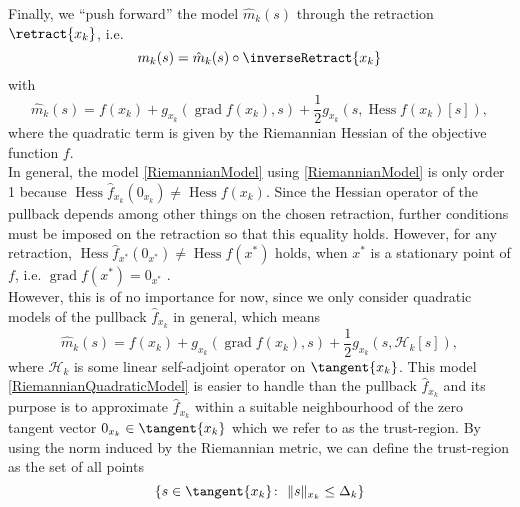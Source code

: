 Finally, we “push forward” the model $\hat{m}_k(s)$ through the retraction $\retract{x_k}$, i.e.
\begin{equation}\label{RiemannianModel}
    m_k(s) = \hat{m}_k(s) \circ \inverseRetract{x_k}
\end{equation}
with
\begin{equation}\label{RiemannianModelTangent}
    \hat{m}_k( s ) = f(x_k) + g_{x_k}(\operatorname{grad} f(x_k), s ) + \frac{1}{2} g_{x_k}( s, \operatorname{Hess} f(x_k) [s]),
\end{equation}
where the quadratic term is given by the Riemannian Hessian of the objective function $f$. \\
In general, the model \cref{RiemannianModel} using \cref{RiemannianModel} is only order 1 because $\operatorname{Hess} \hat{f}_{x_k}(0_{x_k}) \neq \operatorname{Hess} f(x_k)$. Since the Hessian operator of the pullback depends among other things on the chosen retraction, further conditions must be imposed on the retraction so that this equality holds. However, for any retraction, $\operatorname{Hess} \hat{f}_{x^*}(0_{x^*}) \neq \operatorname{Hess} f(x^*)$ holds, when $x^*$ is a stationary point of $f$, i.e. $\operatorname{grad} f(x^*) = 0_{x^*}$ \cite[p.~138-139]{AbsilMahonySepulchre:2008}. \\
However, this is of no importance for now, since we only consider quadratic models of the pullback $\hat{f}_{x_k}$ in general, which means 
\begin{equation}\label{RiemannianQuadraticModel}
    \hat{m}_k( s ) = f(x_k) + g_{x_k}(\operatorname{grad} f(x_k), s ) + \frac{1}{2} g_{x_k}( s, \mathcal{H}_k [s]),
\end{equation}
where $\mathcal{H}_k$ is some linear self-adjoint operator on $\tangent{x_k}$. This model \cref{RiemannianQuadraticModel} is easier to handle than the pullback $\hat{f}_{x_k}$ and its purpose is to approximate $\hat{f}_{x_k}$ within a suitable neighbourhood of the zero tangent vector $0_{x_k} \in \tangent{x_k}$ which we refer to as the trust-region. By using the norm induced by the Riemannian metric, we can define the trust-region as the set of all points
\begin{equation}\label{RiemannianTrustRegion}
    \{ s \in \tangent{x_k} \colon \ \lVert s \rVert_{x_k} \leq \Delta_k \}
\end{equation}
